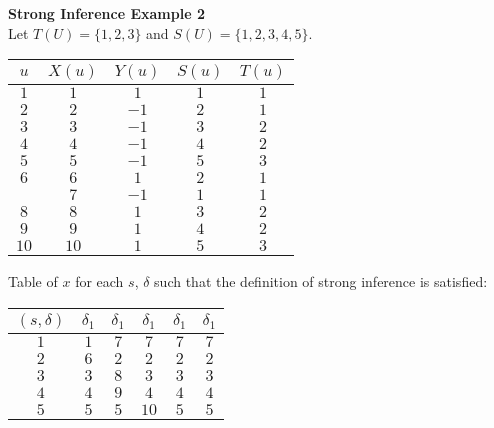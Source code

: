 \documentclass[11pt]{article}
\begin{document}
 \textbf{Strong Inference Example 2} \\
 
 Let $ T(U) = \{1, 2, 3\} $ and $ S(U) = \{1, 2, 3, 4, 5\} $.
 \begin{center}
 \begin{tabular}{ c||c|c|c|c } 

 $ u $ & $ X(u) $ & $ Y(u) $ & $ S(u) $ & $ T(u) $ \\ 
 \hline
 \hline
 $ 1 $ & $ 1 $ & $ 1 $ & $ 1 $ & $ 1 $ \\
 \hline
 $ 2 $ & $ 2 $ & $ -1 $ & $ 2 $ & $ 1 $ \\
 \hline
 $ 3 $ & $ 3 $ & $ -1 $ & $ 3 $ & $ 2 $ \\
 \hline
 $ 4 $ & $ 4 $ & $ -1 $ & $ 4 $ & $ 2 $ \\
 \hline
 $ 5 $ & $ 5 $ & $ -1 $ & $ 5 $ & $ 3 $ \\
 \hline
 $ 6 $ & $ 6 $ & $ 1 $ & $ 2 $ & $ 1 $ \\
 \hline
 $  $ & $ 7 $ & $ -1 $ & $ 1 $ & $ 1 $ \\
 \hline
 $ 8 $ & $ 8 $ & $ 1 $ & $ 3 $ & $ 2 $ \\
 \hline
 $ 9 $ & $ 9 $ & $ 1 $ & $ 4 $ & $ 2 $ \\
 \hline
 $ 10 $ & $ 10 $ & $ 1 $ & $ 5 $ & $ 3 $ \\
 
 \end{tabular}
 \end{center} 
 
 Table of $ x $ for each $ s $, $ \delta $ such that the definition of strong inference is satisfied:
 \begin{center}
 \begin{tabular}{ c||c|c|c|c|c } 

 $ (s, \delta) $ & $ \delta_1 $ & $ \delta_1 $ & $ \delta_1 $ & $ \delta_1 $ & $ \delta_1 $ \\ 
 \hline
 \hline
 $ 1 $ & $ 1 $ & $ 7 $ & $ 7 $ & $ 7 $ & $ 7 $ \\
 \hline
 $ 2 $ & $ 6 $ & $ 2 $ & $ 2 $ & $ 2 $ & $ 2 $ \\
 \hline
 $ 3 $ & $ 3 $ & $ 8 $ & $ 3 $ & $ 3 $ & $ 3 $ \\
 \hline
 $ 4 $ & $ 4 $ & $ 9 $ & $ 4 $ & $ 4 $ & $ 4 $ \\
 \hline 
 $ 5 $ & $ 5 $ & $ 5 $ & $ 10 $ & $ 5 $ & $ 5 $ \\
 
 \end{tabular}
 \end{center} 
 
\end{document}

